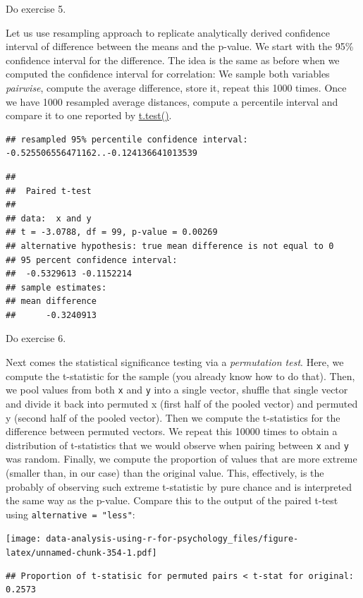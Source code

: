\documentclass[
]{book}
\begin{document}
Do exercise 5.

Let us use resampling approach to replicate analytically derived confidence interval of difference between the means and the p-value. We start with the 95\% confidence interval for the difference. The idea is the same as before when we computed the confidence interval for correlation: We sample both variables \emph{pairwise}, compute the average difference, store it, repeat this 1000 times. Once we have 1000 resampled average distances, compute a percentile interval and compare it to one reported by \href{https://stat.ethz.ch/R-manual/R-devel/library/stats/html/t.test.html}{t.test()}.

\begin{verbatim}
## resampled 95% percentile confidence interval: -0.525506556471162..-0.124136641013539
\end{verbatim}

\begin{verbatim}
## 
##  Paired t-test
## 
## data:  x and y
## t = -3.0788, df = 99, p-value = 0.00269
## alternative hypothesis: true mean difference is not equal to 0
## 95 percent confidence interval:
##  -0.5329613 -0.1152214
## sample estimates:
## mean difference 
##      -0.3240913
\end{verbatim}

Do exercise 6.

Next comes the statistical significance testing via a \emph{permutation test}. Here, we compute the t-statistic for the sample (you already know how to do that). Then, we pool values from both \texttt{x} and \texttt{y} into a single vector, shuffle that single vector and divide it back into permuted x (first half of the pooled vector) and permuted y (second half of the pooled vector). Then we compute the t-statistics for the difference between permuted vectors. We repeat this 10000 times to obtain a distribution of t-statistics that we would observe when pairing between \texttt{x} and \texttt{y} was random. Finally, we compute the proportion of values that are more extreme (smaller than, in our case) than the original value. This, effectively, is the probably of observing such extreme t-statistic by pure chance and is interpreted the same way as the p-value. Compare this to the output of the paired t-test using \texttt{alternative\ =\ "less"}:

\texttt{[image: data-analysis-using-r-for-psychology\_files/figure-latex/unnamed-chunk-354-1.pdf]}

\begin{verbatim}
## Proportion of t-statisic for permuted pairs < t-stat for original: 0.2573
\end{verbatim}
\end{document}
